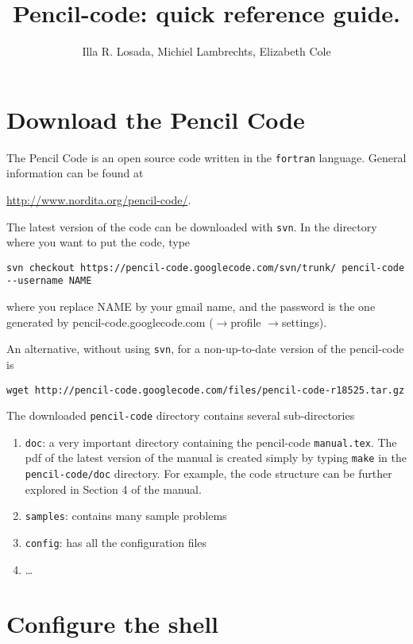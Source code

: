 \documentclass[a4paper,12pt]{article}
\title{Pencil-code: quick reference guide.}
\author{Illa R. Losada, Michiel Lambrechts, Elizabeth Cole }
\begin{document}
\maketitle

\tableofcontents

\newpage

\section{Download the Pencil Code}
The Pencil Code is an open source code written in the \verb|fortran| language. General information can be found at

\url{http://www.nordita.org/pencil-code/}.

The latest version of the code can be downloaded with \verb|svn|. In the
directory where you want to put the code, type
\begin{verbatim}
svn checkout https://pencil-code.googlecode.com/svn/trunk/ pencil-code
--username NAME
\end{verbatim}
where you replace NAME by your gmail name, and the password is the
one generated by pencil-code.googlecode.com ($\rightarrow$profile
$\rightarrow$settings). 

An alternative, without using \verb|svn|, for a non-up-to-date version of the pencil-code is
\begin{verbatim}
wget http://pencil-code.googlecode.com/files/pencil-code-r18525.tar.gz
\end{verbatim}

The downloaded \verb|pencil-code| directory contains several sub-directories
\begin{enumerate}
  \item \verb|doc|: a very important directory containing the pencil-code
    \verb|manual.tex|. The pdf of the latest version of the manual is created
    simply by typing \verb|make| in the \verb|pencil-code/doc| directory. For
    example, the code structure can be further explored in Section 4 of the
    manual.
  \item \verb|samples|: contains many sample problems
  \item \verb|config|: has all the configuration files
  \item \dots
\end{enumerate}

\section{Configure the shell}
\end{document}
